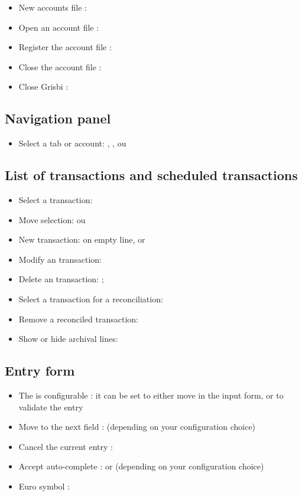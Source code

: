 \begin{itemize}
	\item New accounts file : 
	\item Open an account file : 
	\item Register the account file : 
	\item Close the account file : 
	\item Close Grisbi : 
\end{itemize}


\subsection{Navigation panel}

\begin{itemize}
	\item Select a tab or account: , ,  ou 
\end{itemize}

\subsection{List of transactions and scheduled transactions}

\begin{itemize}
	\item Select a transaction: 
	\item Move selection: ou 
	\item New transaction:   on empty line, or 
	\item Modify an transaction: 
	\item Delete an transaction:  ;
	\item Select a transaction for a reconciliation:
	\item Remove a reconciled transaction: 
	\item Show or hide archival lines: 
\end{itemize}


\subsection{Entry form}

\begin{itemize}
	\item The  is configurable : it can be set to either move in the input form, or to validate the entry
	\item Move to the next field :  (depending on your configuration choice)
	\item Cancel the current entry : 
	\item Accept auto-complete :  or  (depending on your configuration choice)
	\item  Euro symbol : 
\end{itemize}

